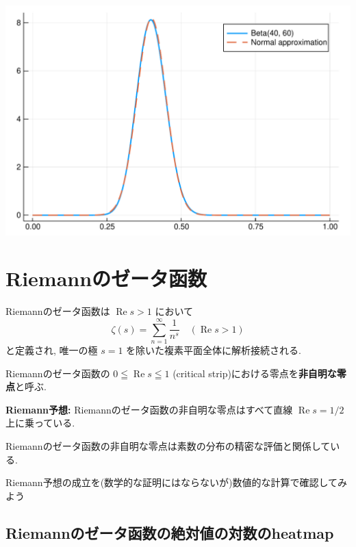 \documentclass[12pt,a4paper,xelatex,ja=standard]{bxjsarticle}
\newcommand\real{\operatorname{Re}}
\begin{document}
\begin{center}
\includegraphics[width=0.8\linewidth]{figures/テスト_4_1.pdf}
\end{center}

\section{Riemannのゼータ函数}
Riemannのゼータ函数は $\real s > 1$ において
\[
\zeta(s) = \sum_{n=1}^\infty \frac{1}{n^s} \quad (\real s > 1)
\]
と定義され, 唯一の極 $s=1$ を除いた複素平面全体に解析接続される. 

Riemannのゼータ函数の $0\leqq \real s\leqq 1$ (critical strip)における零点を\textbf{非自明な零点}と呼ぶ. 

\textbf{Riemann予想:} Riemannのゼータ函数の非自明な零点はすべて直線 $\real s=1/2$ 上に乗っている. 

Riemannのゼータ函数の非自明な零点は素数の分布の精密な評価と関係している.

Riemann予想の成立を(数学的な証明にはならないが)数値的な計算で確認してみよう

\subsection{Riemannのゼータ函数の絶対値の対数のheatmap}
\end{document}
